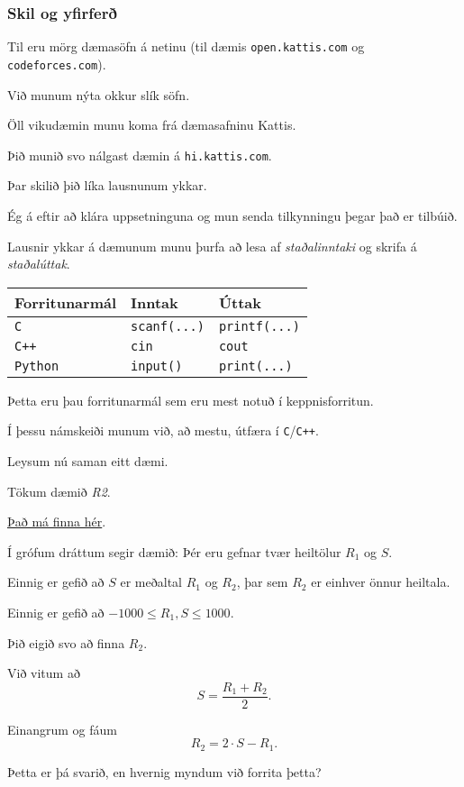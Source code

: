 {
	\frametitle{Skil og yfirferð}
	{
		\item<1-> Til eru mörg dæmasöfn á netinu (til dæmis \texttt{open.kattis.com} og \texttt{codeforces.com}).
		\item<2-> Við munum nýta okkur slík söfn.
		\item<3-> Öll vikudæmin munu koma frá dæmasafninu Kattis.
		\item<4-> Þið munið svo nálgast dæmin á \texttt{hi.kattis.com}.
		\item<5-> Þar skilið þið líka lausnunum ykkar.
		\item<6-> Ég á eftir að klára uppsetninguna og mun senda tilkynningu þegar það er tilbúið.
	}
}

{
	{
		\item<1-> Lausnir ykkar á dæmunum munu þurfa að lesa af \emph{staðalinntaki} og skrifa á \emph{staðalúttak}.
		\pause

		\begin{tabular}{l l l}
			Forritunarmál & Inntak & Úttak\\
			\hline
			\texttt{C} & \texttt{scanf(...)} & \texttt{printf(...)}\\
			\texttt{C++} & \texttt{cin} & \texttt{cout}\\
			\texttt{Python} & \texttt{input()} & \texttt{print(...)}
		\end{tabular}

		\item<3-> Þetta eru þau forritunarmál sem eru mest notuð í keppnisforritun.
		\item<4-> Í þessu námskeiði munum við, að mestu, útfæra í \texttt{C}/\texttt{C++}.
		\item<5-> Leysum nú saman eitt dæmi.
	}
}

{
	{
		\item<1-> Tökum dæmið \emph{R2}.
		\item<2-> \href{https://hi.kattis.com/problems/r2}{Það má finna hér}.
		\item<3-> Í grófum dráttum segir dæmið: Þér eru gefnar tvær heiltölur $R_1$ og $S$.
		\item<4-> Einnig er gefið að $S$ er meðaltal $R_1$ og $R_2$, þar sem $R_2$ er einhver önnur heiltala.
		\item<5-> Einnig er gefið að $-1000 \leq R_1, S \leq 1000$.
		\item<6-> Þið eigið svo að finna $R_2$.
	}
}

{
	{
		\item<1-> Við vitum að
		\[
			S = \frac{R_1 + R_2}{2}.
		\]
		\item<2-> Einangrum og fáum
		\[
			R_2 = 2 \cdot S - R_1.
		\]
		\item<3-> Þetta er þá svarið, en hvernig myndum við forrita þetta?
	}
}

